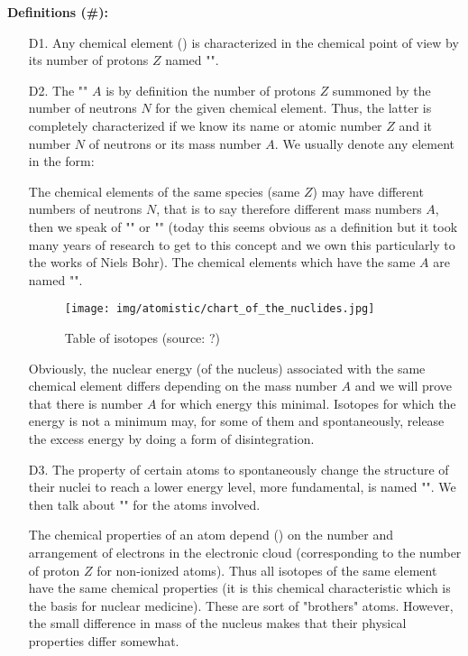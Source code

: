 	\textbf{Definitions (\#\mydef):}
	\begin{enumerate}
		\item[D1.] Any chemical element () is characterized in the chemical point of view by its number of protons $Z$ named "".
		
		\item[D2.] The "" $A$ is by definition the number of protons $Z$ summoned by the number of neutrons $N$ for the given chemical element. Thus, the latter is completely characterized if we know its name or atomic number $Z$ and it  number $N$ of neutrons or its mass number $A$. We usually denote any element in the form:
		
		The chemical elements of the same species (same $Z$) may have different numbers of neutrons $N$, that is to say therefore different mass numbers $A$, then we speak of "\label{isotope}" or "" (today this seems obvious as a definition but it took many years of research to get to this concept and we own this particularly to the works of Niels Bohr). The chemical elements which have the same $A$ are named "".
		\begin{figure}[H]
		\centering
		\texttt{[image: img/atomistic/chart\_of\_the\_nuclides.jpg]}	
		\caption[Table of isotopes]{Table of isotopes (source: ?)}
	\end{figure}
		Obviously, the nuclear energy (of the nucleus) associated with the same chemical element differs depending on the mass number $A$ and we will prove that there is number $A$ for which energy this minimal. Isotopes for which the energy is not a minimum may, for some of them and spontaneously, release the excess energy by doing a form of disintegration.
		
		\item[D3.] The property of certain atoms to spontaneously change the structure of their nuclei to reach a lower energy level, more fundamental, is named "". We then talk about "" for the atoms involved.
		
		The chemical properties of an atom depend () on the number and arrangement of electrons in the electronic cloud (corresponding to the number of proton $Z$ for non-ionized atoms). Thus all isotopes of the same element have the same chemical properties (it is this chemical characteristic which is the basis for nuclear medicine). These are sort of "brothers" atoms. However, the small difference in mass of the nucleus makes that their physical properties differ somewhat.
		

\end{enumerate}
